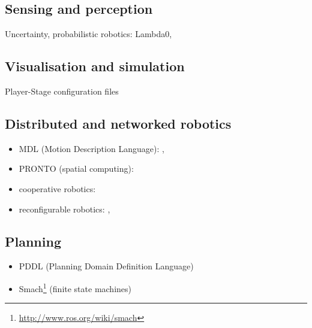 \documentclass[doc]{apa}
\begin{document}
\subsection{Sensing and perception}
Uncertainty, probabilistic robotics: Lambda0, \cite{Thrun:2000}
\subsection{Visualisation and simulation}
Player-Stage configuration files\cite{Collett:2005bq}
\subsection{Distributed and networked robotics}
\begin{itemize}
\item MDL (Motion Description Language): \cite{Martin:2008vn}, \cite{Martin:2010uq}
\item PRONTO (spatial computing): \cite{Bachrach:2008bs}
\item cooperative robotics: \cite{Welborn:2005dg}
\item reconfigurable robotics: \cite{Schultz:2007le}, \cite{Schultz:2008vl}
\end{itemize}
\subsection{Planning}
\begin{itemize}
\item PDDL (Planning Domain Definition Language)
\item Smach\footnote{\url{http://www.ros.org/wiki/smach}} (finite state machines)
\end{itemize}


\end{document}
